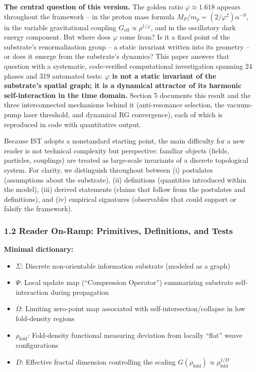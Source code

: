 \documentclass[
]{article}
\providecommand{\tightlist}{%
  \setlength{\itemsep}{0pt}\setlength{\parskip}{0pt}}
\begin{document}
\textbf{The central question of this version.} The golden ratio
\(\varphi \approx 1.618\) appears throughout the framework -- in the
proton mass formula \(M_P/m_p = (2/\varphi^2)\alpha^{-9}\), in the
variable gravitational coupling
\(G_{\text{eff}} \propto \rho^{1/\varphi}\), and in the oscillatory dark
energy component. But where does \(\varphi\) come from? Is it a fixed
point of the substrate's renormalization group -- a static invariant
written into its geometry -- or does it emerge from the substrate's
dynamics? This paper answers that question with a systematic,
code-verified computational investigation spanning 24 phases and 319
automated tests: \textbf{\(\varphi\) is not a static invariant of the
substrate's spatial graph; it is a dynamical attractor of its harmonic
self-interaction in the time domain.} Section 5 documents this result
and the three interconnected mechanisms behind it (anti-resonance
selection, the vacuum-pump laser threshold, and dynamical RG
convergence), each of which is reproduced in code with quantitative
output.

Because IST adopts a nonstandard starting point, the main difficulty for
a new reader is not technical complexity but perspective: familiar
objects (fields, particles, couplings) are treated as large-scale
invariants of a discrete topological system. For clarity, we distinguish
throughout between (i) postulates (assumptions about the substrate),
(ii) definitions (quantities introduced within the model), (iii) derived
statements (claims that follow from the postulates and definitions), and
(iv) empirical signatures (observables that could support or falsify the
framework).

\subsubsection{1.2 Reader On-Ramp: Primitives, Definitions, and
Tests}\label{reader-on-ramp-primitives-definitions-and-tests}

\textbf{Minimal dictionary:}

\begin{itemize}
\tightlist
\item
  \textbf{\(\Sigma\)}: Discrete non-orientable information substrate
  (modeled as a graph)
\item
  \textbf{\(\Psi\)}: Local update map (``Compression Operator'')
  summarizing substrate self-interaction during propagation
\item
  \textbf{\(\Omega\)}: Limiting zero-point map associated with
  self-intersection/collapse in low fold-density regions
\item
  \textbf{\(\rho_{\text{fold}}\)}: Fold-density functional measuring
  deviation from locally ``flat'' weave configurations
\item
  \textbf{\(D\)}: Effective fractal dimension controlling the scaling
  \(G(\rho_{\text{fold}}) \propto \rho_{\text{fold}}^{1/D}\)
\end{itemize}
\end{document}
